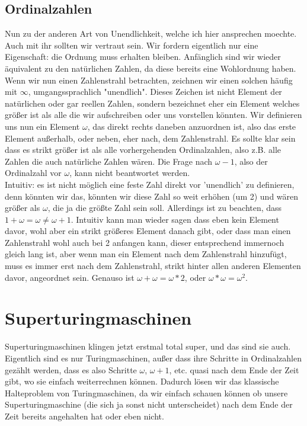 \documentclass{scrartcl}
\begin{document}
\subsection{Ordinalzahlen}
Nun zu der anderen Art von Unendlichkeit, welche ich hier ansprechen moechte.
Auch mit ihr sollten wir vertraut sein.
Wir fordern eigentlich nur eine Eigenschaft: die Ordnung muss erhalten
bleiben. Anfänglich sind wir wieder äquivalent zu den natürlichen Zahlen, da
diese bereits eine Wohlordnung haben. Wenn wir nun einen Zahlenstrahl
betrachten, zeichnen wir einen solchen häufig mit $\infty$, umgangssprachlich
"unendlich". %
Dieses Zeichen ist nicht Element der natürlichen oder gar reellen
Zahlen, sondern bezeichnet eher ein Element welches größer ist als alle die wir
aufschreiben oder uns vorstellen könnten. Wir definieren uns nun ein Element
$\omega$, das direkt rechts daneben anzuordnen ist, also das erste Element
außerhalb, oder neben, eher nach, dem Zahlenstrahl. Es sollte klar sein dass
es strikt größer ist als alle vorhergehenden Ordinalzahlen, also z.B. alle
Zahlen die auch natürliche Zahlen wären. Die Frage nach $\omega - 1$, also der
Ordinalzahl vor $\omega$, kann nicht beantwortet werden.\\
Intuitiv: es ist nicht
möglich eine feste Zahl direkt vor 'unendlich' zu definieren, denn könnten wir
das, könnten wir diese Zahl so weit erhöhen (um 2) und wären größer als
$\omega$, die ja die größte Zahl sein soll. Allerdings ist zu beachten, dass $1
+ \omega = \omega \neq \omega + 1$. Intuitiv kann man wieder sagen dass eben
kein Element davor, wohl aber ein strikt größeres Element danach gibt, oder
dass man einen Zahlenstrahl wohl auch bei 2 anfangen kann, dieser entsprechend
immernoch gleich lang ist, aber wenn man ein Element nach dem Zahlenstrahl
hinzufügt, muss es immer erst nach dem Zahlenstrahl, strikt hinter allen
anderen Elementen davor, angeordnet sein. Genauso ist $\omega + \omega = \omega
* 2$, oder $\omega * \omega = \omega ^ 2$.


\section{Superturingmaschinen}
Superturingmaschinen klingen jetzt erstmal total super, und das sind sie auch.
Eigentlich sind es nur Turingmaschinen, außer dass ihre Schritte in
Ordinalzahlen gezählt werden, dass es also Schritte $\omega$, $\omega + 1$,
etc. quasi nach dem Ende der Zeit gibt, wo sie einfach weiterrechnen können.
Dadurch lösen wir das klassische Halteproblem von Turingmaschinen, da wir
einfach schauen können ob unsere Superturingmaschine (die sich ja sonst nicht
unterscheidet) nach dem Ende der Zeit bereits angehalten hat oder eben nicht.
\end{document}
